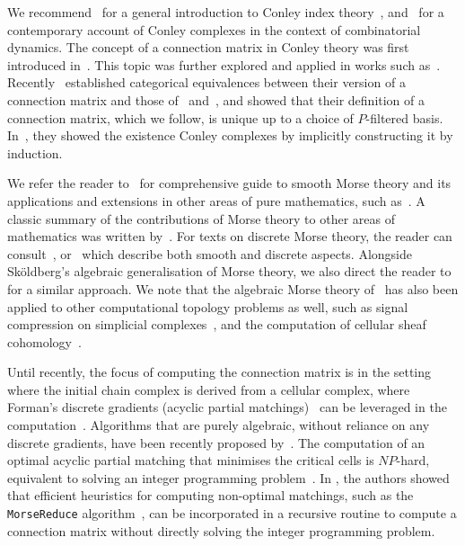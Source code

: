 \documentclass[11pt, table, nothms]{amsart}
\theoremstyle{definition}
\begin{document}
We recommend~\cite{Mischaikow1995ConleyTheory} for a general introduction to Conley index theory~\cite{Conley1978IsolatedIndex}, and~\cite{Mrozek2025ConnectionDynamics} for a contemporary account of Conley complexes in the context of combinatorial dynamics. The concept of a connection matrix in Conley theory was first introduced in~\cite{Franzosa}. This topic was further explored and applied in works such as~\cite{Franzosa1986IndexDecompositions,Reineck1990TheFlows,Robbin1992LyapunovFunctor,Franzosa1998AlgebraicTheory}. Recently~\cite{harker2021} established categorical equivalences between their version of a connection matrix and those of~\cite{Franzosa} and~\cite{Robbin1992LyapunovFunctor}, and showed that their definition of a connection matrix, which we follow, is unique up to a choice of $P$-filtered basis. In~\cite{Robbin1992LyapunovFunctor,Mrozek2025ConnectionDynamics}, they showed the existence Conley complexes by implicitly constructing it by induction.

We refer the reader to~\cite{Nicolaescu2011AnTheory} for comprehensive guide to smooth Morse theory and its applications and extensions in other areas of pure mathematics, such as~\cite{Witten1982SupersymmetryTheory,Floer1987MorseDiffeomorphisms}. A classic summary of the contributions of Morse theory to other areas of mathematics was written by~\cite{Bott1988MorseIndomitable}. For texts on discrete Morse theory, the reader can consult~\cite{Kozlov2021OrganizedTheory}, or~\cite{Knudson2015MorseDiscrete,Scoville2019DiscreteTheory} which describe both smooth and discrete aspects. Alongside Sk\"oldberg's algebraic generalisation of Morse theory, we also direct the reader to~\cite{Kozlov2005DiscreteComplexes} for a similar approach. We note that the algebraic Morse theory of~\cite{Skoldberg2006MorseViewpoint}
has also been applied to other computational topology problems as well, such as signal compression on simplicial complexes~\cite{Ebli2024MorseComplexes}, and the computation of cellular sheaf cohomology~\cite{Curry2016DiscreteCohomology}. 

Until recently, the focus of computing the connection matrix is in the setting where the initial chain complex is derived from a cellular complex, where Forman's discrete gradients (acyclic partial matchings)~\cite{Forman1998MorseComplexes} can be leveraged in the computation~\cite{Mischaikow2013MorseHomology,Harker2014DiscreteMaps,Harker2021MorseComputation,harker2021}. Algorithms that are purely algebraic, without reliance on any discrete gradients, have been recently proposed by~\cite{Dey2024ComputingReductions,Dey2025ComputingDecomposition}. The computation of an optimal acyclic partial matching that minimises the critical cells is $NP$-hard, equivalent to solving an integer programming problem~\cite{Joswig2004ComputingFunctions}. In \cite{harker2021,Harker2021MorseComputation}, the authors showed that efficient heuristics for computing non-optimal matchings, such as the \texttt{MorseReduce} algorithm~\cite{Mischaikow2013MorseHomology}, can be incorporated in a recursive routine to compute a connection matrix without directly solving the integer programming problem. 
\end{document}

